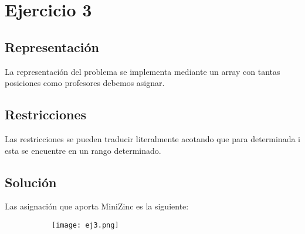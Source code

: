 \section{Ejercicio 3}
\subsection{Representación}
La representación del problema se implementa mediante un array con tantas posiciones como profesores debemos asignar.

\subsection{Restricciones}
Las restricciones se pueden traducir literalmente acotando que para determinada i esta se encuentre en un rango determinado.

\subsection{Solución}

Las asignación que aporta MiniZinc es la siguiente:

\begin{figure}[h]
   \centering
   \begin{subfigure}[b]{0.45\textwidth}
      \texttt{[image: ej3.png]}
   \end{subfigure}
   \hfill
   \begin{subfigure}[b]{0.45\textwidth}
      \begin{table}[H]
      \end{table}
   \end{subfigure}
\end{figure}

